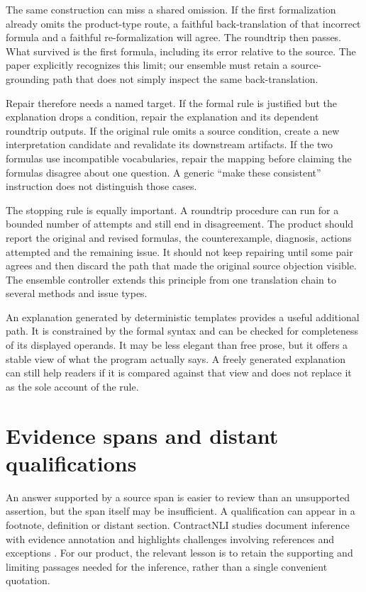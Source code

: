 \documentclass[12pt,a4paper,oneside,openany]{book}
\begin{document}
The same construction can miss a shared omission. If the first formalization
already omits the product-type route, a faithful back-translation of that
incorrect formula and a faithful re-formalization will agree. The roundtrip
then passes. What survived is the first formula, including its error relative
to the source. The paper explicitly recognizes this limit; our ensemble must
retain a source-grounding path that does not simply inspect the same
back-translation.

Repair therefore needs a named target. If the formal rule is justified but
the explanation drops a condition, repair the explanation and its dependent
roundtrip outputs. If the original rule omits a source condition, create a
new interpretation candidate and revalidate its downstream artifacts. If the
two formulas use incompatible vocabularies, repair the mapping before claiming
the formulas disagree about one question. A generic ``make these consistent''
instruction does not distinguish those cases.

The stopping rule is equally important. A roundtrip procedure can run for a
bounded number of attempts and still end in disagreement. The product should
report the original and revised formulas, the counterexample, diagnosis,
actions attempted and the remaining issue. It should not keep repairing
until some pair agrees and then discard the path that made the original
source objection visible. The ensemble controller extends this principle
from one translation chain to several methods and issue types.

An explanation generated by deterministic templates provides a useful
additional path. It is constrained by the formal syntax and can be checked
for completeness of its displayed operands. It may be less elegant than
free prose, but it offers a stable view of what the program actually says.
A freely generated explanation can still help readers if it is compared
against that view and does not replace it as the sole account of the rule.

\section{Evidence spans and distant qualifications}
\label{merge:M04:12}

\label{sec:languages-evidence}
An answer supported by a source span is easier to review than an unsupported
assertion, but the span itself may be insufficient. A qualification can appear
in a footnote, definition or distant section. ContractNLI studies document
inference with evidence annotation and highlights challenges involving
references and exceptions \citep[task, annotation and error-analysis sections]{contractnli2021}.
For our product, the relevant lesson is to retain the supporting and limiting
passages needed for the inference, rather than a single convenient quotation.
\end{document}
